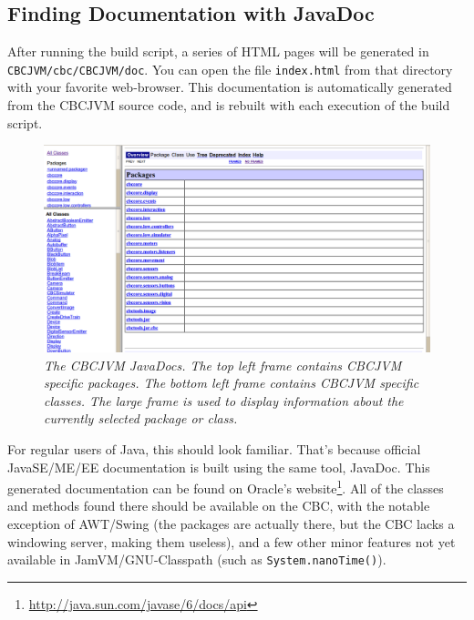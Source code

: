 \documentclass[10pt,letterpaper]{article}
\newcommand{\urlfootnote}[1]{\footnote{\url{#1}}}
\begin{document}
\subsection{Finding Documentation with JavaDoc}

After running the build script, a series of HTML pages will be generated in \texttt{CBCJVM/cbc/CBCJVM/doc}. You can open the file \texttt{index.html} from that directory with your favorite web-browser. This documentation is automatically generated from the CBCJVM source code, and is rebuilt with each execution of the build script.

\begin{figure}[h]
\includegraphics[width=\textwidth]{javadocs.png}
\caption{\textit{The CBCJVM JavaDocs. The top left frame contains CBCJVM specific packages. The bottom left frame contains CBCJVM specific classes. The large frame is used to display information about the currently selected package or class.}}
\end{figure}

For regular users of Java, this should look familiar. That's because official JavaSE/ME/EE documentation is built using the same tool, JavaDoc. This generated documentation can be found on Oracle's website\urlfootnote{http://java.sun.com/javase/6/docs/api}. All of the classes and methods found there should be available on the CBC, with the notable exception of AWT/Swing (the packages are actually there, but the CBC lacks a windowing server, making them useless), and a few other minor features not yet available in JamVM/GNU-Classpath (such as \texttt{System.nanoTime()}).
\end{document}
